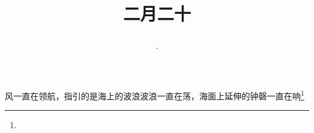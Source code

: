 \title{\date[d=29,m=3,y=2024][year:cn-y,年,month:cn,day:cn,日,·,weekday]·二月二十 }
风一直在领航，指引的是海上的波浪波浪一直在荡，海面上延伸的钟磬一直在响\footnote{ }

